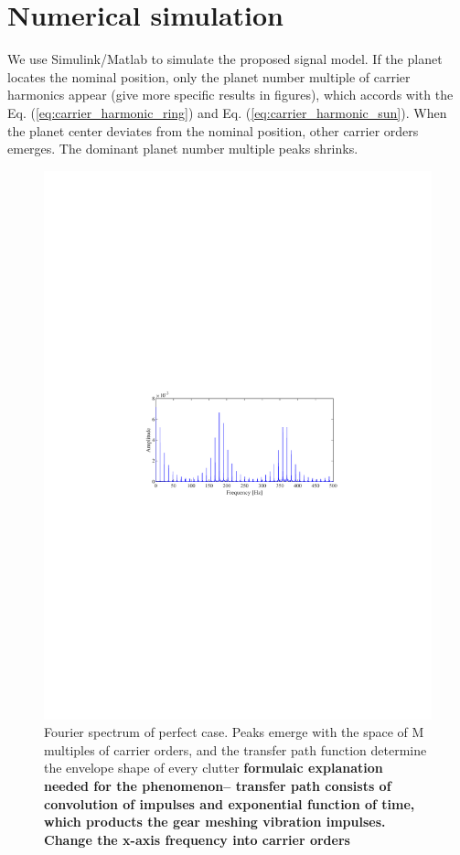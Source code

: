 \documentclass[a4paper,fleqn]{cas-sc}%
\begin{document}
\section{Numerical simulation}
\par We use Simulink/Matlab to simulate the proposed signal model. If the planet locates the nominal position, only the planet number multiple of carrier harmonics appear (give more specific results in figures), which accords with the Eq. (\ref{eq:carrier_harmonic_ring}) and Eq. (\ref{eq:carrier_harmonic_sun}). When the planet center deviates from the nominal position, other carrier orders emerges.  The dominant planet number multiple peaks shrinks. 
\begin{figure}[pos=htbp]
    \centering
    \includegraphics[scale=1]{Simulation_Normal_Fourier.pdf}
    \caption{Fourier spectrum of perfect case. Peaks emerge with the space of M multiples of carrier orders, and the transfer path function determine the envelope shape of every clutter \textbf{formulaic explanation needed for the phenomenon-- transfer path consists of convolution of impulses and exponential function of time, which products the gear meshing vibration impulses. Change the x-axis frequency into carrier orders}}
\end{figure}
\end{document}
